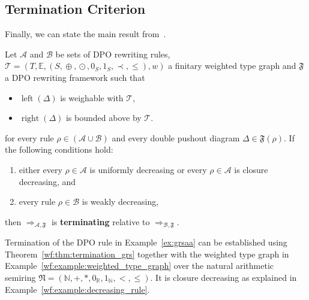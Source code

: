 \subsection{Termination Criterion}
\label{wf:sec:termination}
Finally, we can state the main result from~\cite{endrullis2024generalized_icgt}.
\begin{theorem} 
    \label{wf:thm:termination_grs}
    Let $\mathcal{A}$ and $\mathcal{B}$ be sets of DPO rewriting rules, $\mathcal{T} \mathop{=} (T,\mathbb{E}, (S, \mathop{\oplus}, \mathop{\odot}, 0_S, 1_S, \prec, \leq), w)$ a finitary weighted type graph and $\mathfrak{F}$ a DPO rewriting framework such that

        \begin{itemize} 
            \item \(\operatorname{left}(\Delta)\) is weighable with \(\mathcal{T}\),
            \item \(\operatorname{right}(\Delta)\) is bounded above by \(\mathcal{T}\). 
        \end{itemize}
    for every rule $\rho \mathop{\in} (\mathcal{A }\mathop{\cup} \mathcal{B })$ and every double pushout diagram  
        $\Delta \mathop{\in} \mathfrak{F}(\rho)$. If the following conditions hold:
    \begin{enumerate}
        \item either every $\rho \mathop{\in} \mathcal{A}$ is uniformly decreasing or every $\rho \mathop{\in} \mathcal{A}$ is closure decreasing, and
        \item every rule $\rho \mathop{\in} \mathcal{B}$ is weakly decreasing,
    \end{enumerate}
    then $\mathop{\Rightarrow}_{\mathcal{A},\mathfrak{F}}$ is \textbf{terminating} relative to $\mathop{\Rightarrow}_{\mathcal{B},\mathfrak{F}}$.
\end{theorem} 
\begin{example} 
    \label{wf:example:termination}
    Termination of the DPO rule in Example~\ref{ex:grsaa} can be established using Theorem~\ref{wf:thm:termination_grs} together with the weighted type graph in Example~\ref{wf:example:weighted_type_graph} over the natural arithmetic semiring $\mathfrak{N} \mathop{=} (\mathbb{N},+,*,0_\mathbb{R},1_\mathbb{N},<,\leq)$. It is closure decreasing as explained in Example~\ref{wf:example:decreasing_rule}.
\end{example}
